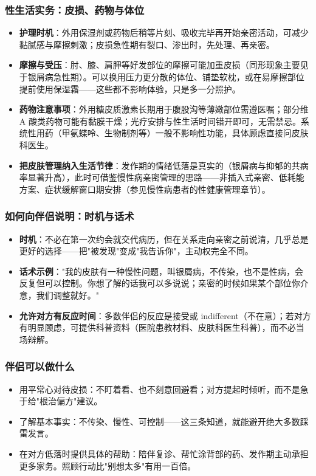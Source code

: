 \subsubsection{性生活实务：皮损、药物与体位}

\begin{itemize}
\item \textbf{护理时机}：外用保湿剂或药物后稍等片刻、吸收完毕再开始亲密活动，可减少黏腻感与摩擦刺激；皮损急性期有裂口、渗出时，先处理、再亲密。
\item \textbf{摩擦与受压}：肘、膝、肩胛等好发部位的摩擦可能加重皮损（同形现象主要见于银屑病急性期）。可以换用压力更分散的体位、铺垫软枕，或在易摩擦部位提前使用保湿霜——这些都不影响体验，只是多一分照护。
\item \textbf{药物注意事项}：外用糖皮质激素长期用于腹股沟等薄嫩部位需遵医嘱；部分维 A 酸类药物可能有黏膜干燥；光疗安排与性生活时间错开即可，无需禁忌。系统性用药（甲氨蝶呤、生物制剂等）一般不影响性功能，具体顾虑直接问皮肤科医生。
\item \textbf{把皮肤管理纳入生活节律}：发作期的情绪低落是真实的（银屑病与抑郁的共病率显著升高），此时可借鉴慢性病亲密管理的思路——非插入式亲密、低耗能方案、症状缓解窗口期安排（参见慢性病患者的性健康管理章节）。
\end{itemize}

\subsubsection{如何向伴侣说明：时机与话术}

\begin{itemize}
\item \textbf{时机}：不必在第一次约会就交代病历，但在关系走向亲密之前说清，几乎总是更好的选择——把"被发现"变成"我告诉你"，主动权完全不同。
\item \textbf{话术示例}："我的皮肤有一种慢性问题，叫银屑病，不传染，也不是性病，会反复但可以控制。你想了解的话我可以多说说；亲密的时候如果某个部位你介意，我们调整就好。"
\item \textbf{允许对方有反应时间}：多数伴侣的反应是接受或 indifferent（不在意）；若对方有明显顾虑，可提供科普资料（医院患教材料、皮肤科医生科普），而不必当场辩解。
\end{itemize}

\subsubsection{伴侣可以做什么}

\begin{itemize}
\item 用平常心对待皮损：不盯着看、也不刻意回避看；对方提起时倾听，而不是急于给"根治偏方"建议。
\item 了解基本事实：不传染、慢性、可控制——这三条知道，就能避开绝大多数踩雷发言。
\item 在对方低落时提供具体的帮助：陪伴复诊、帮忙涂背部的药、发作期主动承担更多家务。照顾行动比"别想太多"有用一百倍。
\end{itemize}

